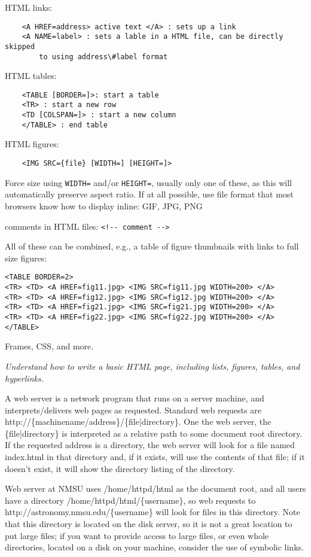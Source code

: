 \documentclass{article}
\newcommand{\test}[1]{%
    \begin{center}
        \colorbox{hl}{\parbox{0.9\textwidth}{\emph{#1}}}
    \end{center}}
\begin{document}
HTML links:
\begin{verbatim}
    <A HREF=address> active text </A> : sets up a link
    <A NAME=label> : sets a lable in a HTML file, can be directly skipped
        to using address\#label format
\end{verbatim}

HTML tables:
\begin{verbatim}
    <TABLE [BORDER=]>: start a table
    <TR> : start a new row
    <TD [COLSPAN=]> : start a new column
    </TABLE> : end table
\end{verbatim}

HTML figures:
\begin{verbatim}
    <IMG SRC={file} [WIDTH=] [HEIGHT=]>
\end{verbatim}
Force size using \verb|WIDTH=| and/or \verb|HEIGHT=|, usually only one of these,
as this will automatically preserve aspect ratio.
If at all possible, use file format that most browsers know how to
display inline: GIF, JPG, PNG

comments in HTML files: \verb|<!-- comment -->|

All of these can be combined, e.g., a table of figure thumbnails with
links to full size figures:
\begin{verbatim}
<TABLE BORDER=2>
<TR> <TD> <A HREF=fig11.jpg> <IMG SRC=fig11.jpg WIDTH=200> </A>
<TR> <TD> <A HREF=fig12.jpg> <IMG SRC=fig12.jpg WIDTH=200> </A>
<TR> <TD> <A HREF=fig21.jpg> <IMG SRC=fig21.jpg WIDTH=200> </A>
<TR> <TD> <A HREF=fig22.jpg> <IMG SRC=fig22.jpg WIDTH=200> </A>
</TABLE>
\end{verbatim}

Frames, CSS, and more.

\test{Understand how to write a basic HTML page, including lists,
figures, tables, and hyperlinks.}

A web server is a network program that runs on a server machine, and
interprets/delivers web pages as requested. Standard web requests are
http://\{machinename/address\}/\{file|directory\}. One the web server, the
\{file|directory\} is interpreted as a relative path to some document
root directory. If the requested address is a directory, the web
server will look for a file named index.html in that directory and, if
it exists, will use the contents of that file; if it doesn't exist, it
will show the directory listing of the directory.

Web server at NMSU uses /home/httpd/html as the document root, and all
users have a directory /home/httpd/html/\{username\}, so web requests to
http://astronomy.nmsu.edu/\{username\} will look for files in this
directory. Note that this directory is located on the disk server, so
it is not a great location to put large files; if you want to provide
access to large files, or even whole directories, located on a disk on
your machine, consider the use of symbolic links.
\end{document}
